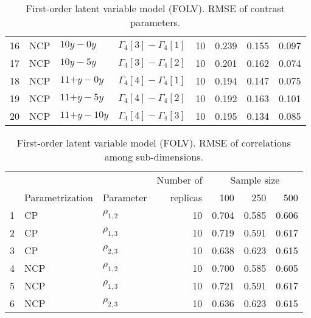 \begin{table}[H]
\begin{tabular}{rlllrrrr}
		16 & NCP & \footnotesize{$10y - 0y$} & $\Gamma_{4}[3] - \Gamma_{4}[1]$ &   10 & 0.239 & 0.155 & 0.097 \\ 
		17 & NCP & \footnotesize{$10y - 5y$} & $\Gamma_{4}[3] - \Gamma_{4}[2]$ &   10 & 0.201 & 0.162 & 0.074 \\ 
		18 & NCP & \footnotesize{$11\text{+}y - 0y$} & $\Gamma_{4}[4] - \Gamma_{4}[1]$ &   10 & 0.194 & 0.147 & 0.075 \\ 
		19 & NCP & \footnotesize{$11\text{+}y - 5y$} & $\Gamma_{4}[4] - \Gamma_{4}[2]$ &   10 & 0.192 & 0.163 & 0.101 \\ 
		20 & NCP & \footnotesize{$11\text{+}y - 10y$} & $\Gamma_{4}[4] - \Gamma_{4}[3]$ &   10 & 0.195 & 0.134 & 0.085 \\ 
		\hline
	\end{tabular}
	\caption[First-order latent variable model (FOLV). RMSE of contrast parameters.]%
	{First-order latent variable model (FOLV). RMSE of contrast parameters.} 
	\label{tab:FOLV_RMSE_contrasts}
\end{table}
%
\begin{table}[H]
	\centering
	\begin{tabular}{rllrrrr}
		\hline
		\multicolumn{3}{c}{ } & Number of &\multicolumn{3}{c}{ Sample size } \\ 
		\cmidrule(rl){5-7}
		& Parametrization  & Parameter & replicas & 100 & 250 & 500 \\  
		\hline\hline
		1 & CP & $\rho_{1,2}$ &  10 & 0.704 & 0.585 & 0.606 \\ 
		2 & CP & $\rho_{1,3}$ &  10 & 0.719 & 0.591 & 0.617 \\ 
		3 & CP & $\rho_{2,3}$ &  10 & 0.638 & 0.623 & 0.615 \\
		\hline
		4 & NCP & $\rho_{1,2}$ &  10 & 0.700 & 0.585 & 0.605 \\ 
		5 & NCP & $\rho_{1,3}$ &  10 & 0.721 & 0.591 & 0.617 \\
		6 & NCP & $\rho_{2,3}$ &  10 & 0.636 & 0.623 & 0.615 \\ 
		\hline
	\end{tabular}
	\caption[First-order latent variable model (FOLV). RMSE of correlations among sub-dimensions.]%
	{First-order latent variable model (FOLV). RMSE of correlations among sub-dimensions.}
	\label{tab:FOLV_RMSE_corr}
\end{table}
%
